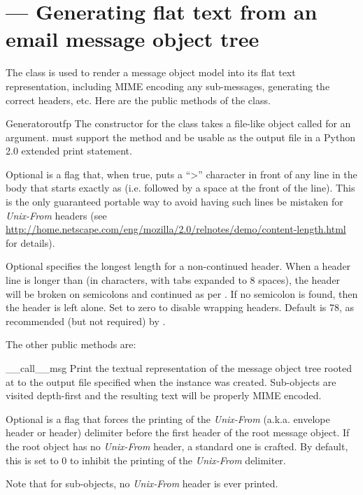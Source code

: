 \section{ ---
         Generating flat text from an email message object tree}



The  class is used to render a message object model
into its flat text representation, including MIME encoding any
sub-messages, generating the correct  headers, etc.  Here
are the public methods of the  class.

\begin{classdesc}{Generator}{outfp}
The constructor for the  class takes a file-like
object called  for an argument.   must support
the  method and be usable as the output file in a
Python 2.0 extended print statement.

Optional  is a flag that, when true, puts a ``>''
character in front of any line in the body that starts exactly as
 (i.e.  followed by a space at the front of the
line).  This is the only guaranteed portable way to avoid having such
lines be mistaken for \emph{Unix-From} headers (see
\url{http://home.netscape.com/eng/mozilla/2.0/relnotes/demo/content-length.html}
 for details).

Optional  specifies the longest length for a
non-continued header.  When a header line is longer than
 (in characters, with tabs expanded to 8 spaces),
the header will be broken on semicolons and continued as per
.  If no semicolon is found, then the header is left alone.
Set to zero to disable wrapping headers.  Default is 78, as
recommended (but not required) by .
\end{classdesc}

The other public  methods are:

\begin{methoddesc}[Generator]{__call__}{msg}
Print the textual representation of the message object tree rooted at
 to the output file specified when the 
instance was created.  Sub-objects are visited depth-first and the
resulting text will be properly MIME encoded.

Optional  is a flag that forces the printing of the
\emph{Unix-From} (a.k.a. envelope header or  header)
delimiter before the first  header of the root message
object.  If the root object has no \emph{Unix-From} header, a standard
one is crafted.  By default, this is set to 0 to inhibit the printing
of the \emph{Unix-From} delimiter.

Note that for sub-objects, no \emph{Unix-From} header is ever printed.
\end{methoddesc}

